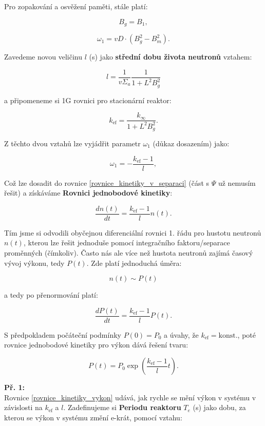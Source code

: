 Pro zopakování a osvěžení paměti, stále platí:

$$ B_g = B_1, $$

$$ \omega_1 = vD \cdot (B_g^2 - B_m^2). $$

Zavedeme novou veličinu $l$ (s) jako \textbf{střední dobu života neutronů} vztahem:

\begin{equation}
  l = \dfrac{1}{v \Sigma_a} \dfrac{1}{1+L^2B_g^2}
  \label{stredni_doba_zivota}
\end{equation}

a připomeneme si 1G rovnici pro stacionární reaktor:

$$ k_{\text{ef}} = \dfrac{k_{\infty}}{1 + L^2 B_g^2}. $$

Z těchto dvou vztahů lze vyjádřit parametr $\omega_1$ (důkaz dosazením) jako:

$$ \omega_1 = -\dfrac{k_{\text{ef}} - 1}{l}, $$

Což lze dosadit do rovnice \eqref{rovnice_kinetiky_v_separaci} (část s $\Psi$ už nemusím řešit) a získáváme \textbf{Rovnici jednobodové kinetiky}:

\begin{equation}
  \dfrac{dn(t)}{dt} = \dfrac{k_{\text{ef}} - 1}{l} n(t).
  \label{rovnice_kinetiky_reseni}
\end{equation}

Tím jsme si odvodili obyčejnou diferenciální rovnici 1. řádu pro hustotu neutronů $n(t)$, kterou lze řešit jednoduše pomocí integračního faktoru/separace proměnných (čímkoliv). Často nás ale více než hustota neutronů zajímá časový vývoj výkonu, tedy $P(t)$. Zde platí jednoduchá úměra:

$$ n(t) \sim P(t) $$

a tedy po přenormování platí:

$$ \dfrac{dP(t)}{dt} = \dfrac{k_{\text{ef}} - 1}{l} P(t). $$

S předpokladem počáteční podmínky $P(0) = P_0$ a úvahy, že $k_{\text{ef}} = \text{konst.}$, poté rovnice jednobodové kinetiky pro výkon dává řešení tvaru:

\begin{equation}
  P(t) = P_0 \exp \left ( \dfrac{k_{\text{ef}} - 1}{l} t \right ).
  \label{rovnice_kinetiky_vykon}
\end{equation}

\textbf{Př. 1:}\\

Rovnice \eqref{rovnice_kinetiky_vykon} udává, jak rychle se mění výkon v systému v závislosti na $k_{\text{ef}}$ a $l$. Zadefinujeme si \textbf{Periodu reaktoru} $T_e$ (s) jako dobu, za kterou se výkon v systému změní e-krát, pomocí vztahu:

